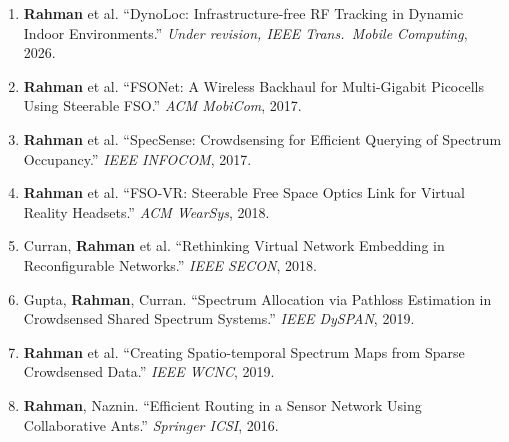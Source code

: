 \documentclass[10.5pt,letterpaper]{article}
\begin{document}
\begin{enumerate}[leftmargin=1.6em, itemsep=1pt, topsep=2pt, parsep=0pt]
  \item \textbf{Rahman} et al. ``DynoLoc: Infrastructure-free RF Tracking in Dynamic Indoor
        Environments.'' \textit{Under revision, IEEE Trans.\ Mobile Computing}, 2026.
  \item \textbf{Rahman} et al. ``FSONet: A Wireless Backhaul for Multi-Gigabit Picocells Using
        Steerable FSO.'' \textit{ACM MobiCom}, 2017.
  \item \textbf{Rahman} et al. ``SpecSense: Crowdsensing for Efficient Querying of Spectrum
        Occupancy.'' \textit{IEEE INFOCOM}, 2017.
  \item \textbf{Rahman} et al. ``FSO-VR: Steerable Free Space Optics Link for Virtual Reality
        Headsets.'' \textit{ACM WearSys}, 2018.
  \item Curran, \textbf{Rahman} et al. ``Rethinking Virtual Network Embedding in Reconfigurable
        Networks.'' \textit{IEEE SECON}, 2018.
  \item Gupta, \textbf{Rahman}, Curran. ``Spectrum Allocation via Pathloss Estimation in
        Crowdsensed Shared Spectrum Systems.'' \textit{IEEE DySPAN}, 2019.
  \item \textbf{Rahman} et al. ``Creating Spatio-temporal Spectrum Maps from Sparse Crowdsensed
        Data.'' \textit{IEEE WCNC}, 2019.
  \item \textbf{Rahman}, Naznin. ``Efficient Routing in a Sensor Network Using Collaborative
        Ants.'' \textit{Springer ICSI}, 2016.
\end{enumerate}
\end{document}
